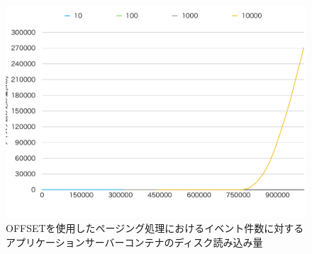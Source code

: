 \documentclass[../../../../../main]{subfiles}
\begin{document}
    \begin{figure}[H]
        \centering
        \includegraphics[width=12cm]{graph}
        \caption{OFFSETを使用したページング処理におけるイベント件数に対するアプリケーションサーバーコンテナのディスク読み込み量}
        \label{fig:paging-offset-app-disk-out-app_1_1024-db_1_1024}
    \end{figure}
\end{document}
